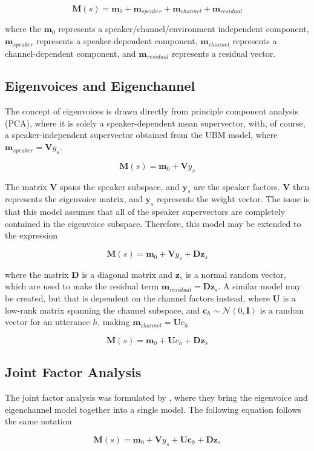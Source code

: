 $$\bm{M}(s) = \bm{m}_0 + \bm{m}_{speaker} + \bm{m}_{channel} + \bm{m}_{residual}$$

where the $\bm{m}_0$ represents a speaker/channel/environment independent component, $\bm{m}_{speaker}$ represents a speaker-dependent component, $\bm{m}_{channel}$ represents a channel-dependent component, and $\bm{m}_{residual}$ represents a residual vector.

\subsection{Eigenvoices and Eigenchannel}
The concept of eigenvoices is drawn directly from principle component analysis (PCA), where it is solely a speaker-dependent mean supervector, with, of course, a speaker-independent supervector obtained from the UBM model, where $\bm{m}_{speaker} = \bm{V}{y}_s$.

$$\bm{M}(s) = \bm{m}_0 + \bm{V}{y}_s$$

The matrix $\bm{V}$ spans the speaker subspace, and $\bm{y}_s$ are the speaker factors. $\bm{V}$ then represents the eigenvoice matrix, and $\bm{y}_s$ represents the weight vector. The issue is that this model assumes that all of the speaker supervectors are completely contained in the eigenvoice subspace. Therefore, this model may be extended to the expression

$$\bm{M}(s) = \bm{m}_0 + \bm{V}{y}_s + \bm{D}\bm{z}_s$$

where the matrix $\bm{D}$ is a diagonal matrix and $\bm{z}_s$ is a normal random vector, which are used to make the residual term $\bm{m}_{residual} = \bm{Dz}_s$. A similar model may be created, but that is dependent on the channel factors instead, where $\bm{U}$ is a low-rank matrix spanning the channel subspace, and $\bm{c}_h\sim \mathcal{N}(0,\bm{I})$ is a random vector for an utterance $h$, making $\bm{m}_{channel} = \bm{U}{c}_h$

$$\bm{M}(s) = \bm{m}_0 + \bm{U}{c}_h + \bm{D}\bm{z}_s$$

\subsection{Joint Factor Analysis}
The joint factor analysis was formulated by \cite{JFA1}, where they bring the eigenvoice and eigenchannel model together into a single model. The following equation follows the same notation

$$\bm{M}(s) = \bm{m}_0 + \bm{V}{y}_s + \bm{U}\bm{c}_h + \bm{D}\bm{z}_s$$

